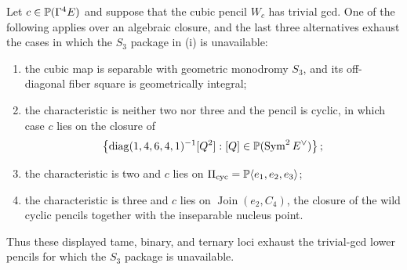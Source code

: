 \begin{proposition}
\label{prop:r6-lower-carrier}%
%
Let \(c\in\mathbb P(\Gamma^4E)\) and suppose that the cubic pencil \(W_c\)
has trivial gcd.  One of the following applies over an algebraic
closure, and the last three alternatives exhaust the cases in which
the \(S_3\) package in (i) is unavailable:
\begin{enumerate}[label=\textup{(\roman*)}]
\item the cubic map is separable with geometric monodromy \(S_3\), and
      its off-diagonal fiber square is geometrically integral;
\item the characteristic is neither two nor three and the pencil is cyclic, in
      which case \(c\) lies on the closure of
      \[
      \left\{\operatorname{diag}(1,4,6,4,1)^{-1}[Q^2]:
      [Q]\in\mathbb P(\operatorname{Sym}^2E^\vee)\right\};
      \]
\item the characteristic is two and \(c\) lies on
      \(\Pi_{\mathrm{cyc}}=\mathbb P\langle e_1,e_2,e_3\rangle\);
\item the characteristic is three and \(c\) lies on
      \(\operatorname{Join}(e_2,C_4)\), the closure of the wild cyclic
      pencils together with the inseparable nucleus point.
\end{enumerate}
Thus these displayed tame, binary, and ternary loci exhaust the
trivial-gcd lower pencils for which the \(S_3\) package is unavailable.
\end{proposition}

